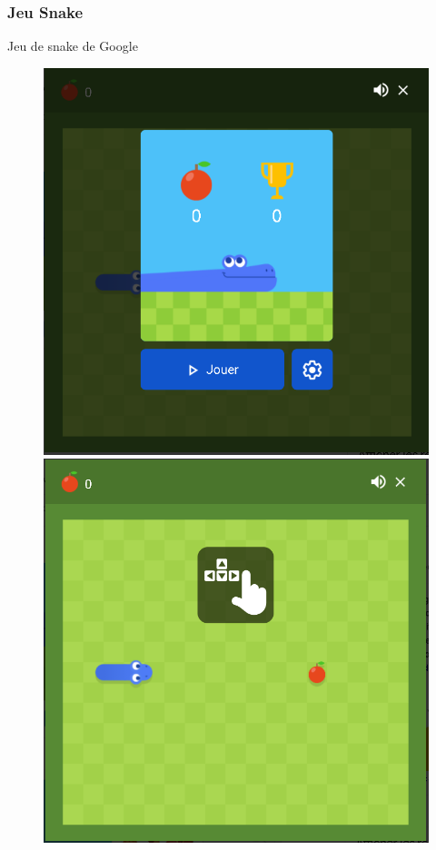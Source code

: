 \documentclass{beamer}
\begin{document}
\begin{frame}
    \frametitle{Jeu Snake}
    Jeu de snake de Google
    \begin{figure}
  	\begin{minipage}[H]{0.5\linewidth}
        \centering
        \includegraphics[scale=0.30]{MenuGoogleSnake.png}
    \end{minipage}\hfill
    \begin{minipage}[H]{0.50\linewidth}
        \centering
        \includegraphics[scale=0.30]{JeuGoogleSnake.png}
    \end{minipage}\hfill
  \end{figure}
    
\end{frame}
\end{document}

